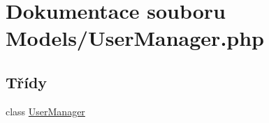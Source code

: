 \hypertarget{_user_manager_8php}{\section{Dokumentace souboru Models/\-User\-Manager.php}
\label{_user_manager_8php}
}
\subsection*{Třídy}
\begin{DoxyCompactItemize}
\item 
class \hyperlink{class_user_manager}{User\-Manager}
\end{DoxyCompactItemize}
